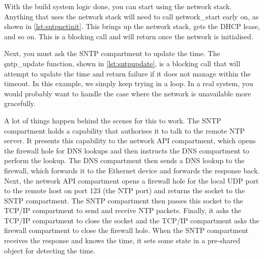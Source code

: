 \lualisting[filename=examples/sntp/xmake.lua,marker=network_stack_threads,label=lst:xmakenetthreads,caption="Build system code for defining the network stack's threads."]{}

With the build system logic done, you can start using the network stack.
Anything that uses the network stack will need to call \c{network_start} early on, as shown in \ref{lst:sntpnetinit}.
This brings up the network stack, gets the DHCP lease, and so on.
This is a blocking call and will return once the network is initialised.

\codelisting[filename=examples/sntp/sntp.cc,marker=network_init,label=lst:sntpnetinit,caption="Initialisation for the network stack."]{}

Next, you must ask the SNTP compartment to update the time.
The \c{sntp_update} function, shown in \ref{lst:sntpupdate}, is a blocking call that will attempt to update the time and return failure if it does not manage within the timeout.
In this example, we simply keep trying in a loop.
In a real system, you would probably want to handle the case where the network is unavailable more gracefully.

\codelisting[filename=examples/sntp/sntp.cc,marker=sntp_update,label=lst:sntpupdate,caption="Updating the time from the SNTP server."]{}

A lot of things happen behind the scenes for this to work.
The SNTP compartment holds a capability that authorises it to talk to the remote NTP server.
It presents this capability to the network API compartment, which opens the firewall hole for DNS lookups and then instructs the DNS compartment to perform the lookup.
The DNS compartment then sends a DNS lookup to the firewall, which forwards it to the Ethernet device and forwards the response back.
Next, the network API compartment opens a firewall hole for the local UDP port to the remote host on port 123 (the NTP port) and returns the socket to the SNTP compartment.
The SNTP compartment then passes this socket to the TCP/IP compartment to send and receive NTP packets.
Finally, it asks the TCP/IP compartment to close the socket and the TCP/IP compartment asks the firewall compartment to close the firewall hole.
When the SNTP compartment receives the response and knows the time, it sets some state in a pre-shared object for detecting the time.

